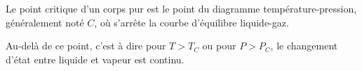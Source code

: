 ﻿\documentclass[a4paper]{article}
\begin{document}
\pagestyle{fancy}
\fancyhf{}
\setlength{\headheight}{15pt}

\begin{center}
	\large{}
\end{center}


Le point critique d'un corps pur est le point du diagramme température-pression, généralement noté $C$, où s'arrête la courbe d'équilibre liquide-gaz.

Au-delà de ce point, c'est à dire pour \( T > T_C \) ou pour \( P > P_C \), le changement d'état entre liquide et vapeur est continu.
\end{document}
